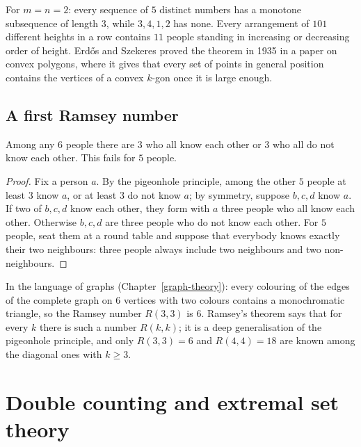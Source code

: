 \begin{example}\label{combinatorics:example-erdos-szekeres}
For $m = n = 2$: every sequence of $5$ distinct numbers has a monotone subsequence of length $3$, while $3, 4, 1, 2$ has none. Every arrangement of $101$ different heights in a row contains $11$ people
standing in increasing or decreasing order of height. Erd\H{o}s and Szekeres proved the theorem in 1935 in a paper on convex polygons, where it gives that every set of points in general position contains
the vertices of a convex $k$-gon once it is large enough.
\end{example}

\subsection{A first Ramsey number}\label{combinatorics:subsection-ramsey-first}

\begin{proposition}\label{combinatorics:proposition-party}
Among any $6$ people there are $3$ who all know each other or $3$ who all do not know each other. This fails for $5$ people.
\end{proposition}

\begin{proof}
Fix a person $a$. By the pigeonhole principle, among the other $5$ people at least $3$ know $a$, or at least $3$ do not know $a$; by symmetry, suppose $b, c, d$ know $a$. If two of $b, c, d$ know each
other, they form with $a$ three people who all know each other. Otherwise $b, c, d$ are three people who do not know each other. For $5$ people, seat them at a round table and suppose that everybody knows
exactly their two neighbours: three people always include two neighbours and two non-neighbours.
\end{proof}

In the language of graphs (Chapter~\ref{graph-theory}): every colouring of the edges of the complete graph on $6$ vertices with two colours contains a monochromatic triangle, so the Ramsey number
$R(3, 3)$ is $6$. Ramsey's theorem says that for every $k$ there is such a number $R(k, k)$; it is a deep generalisation of the pigeonhole principle, and only $R(3, 3) = 6$ and $R(4, 4) = 18$ are known
among the diagonal ones with $k \geq 3$.

\section{Double counting and extremal set theory}\label{combinatorics:section-double-counting}

